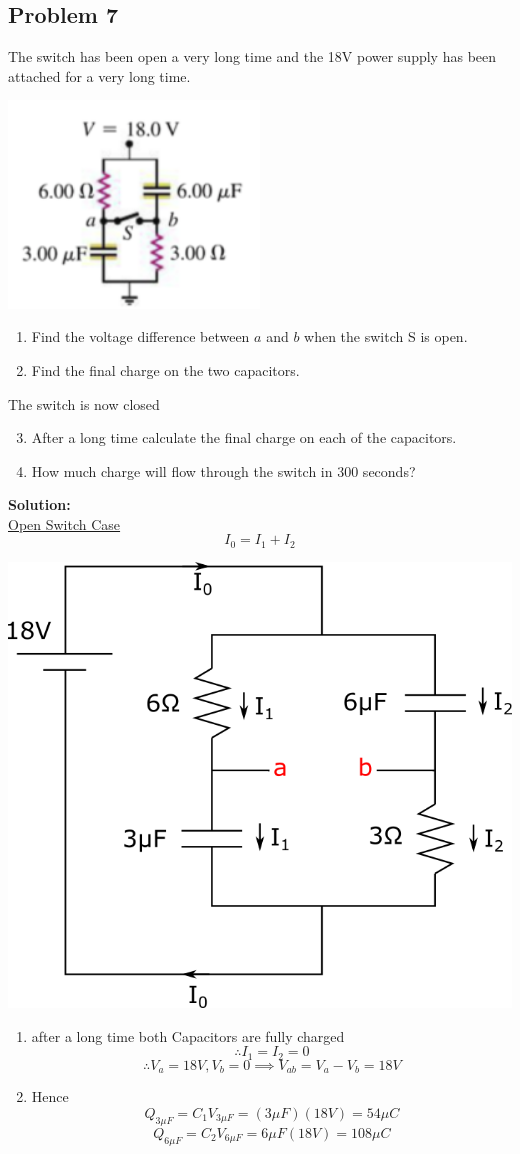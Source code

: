 \subsection*{Problem 7}
The switch has been open a very long time and the 18V power supply has been attached for a very
long time.\\
\centerline{\includegraphics[width=0.5\textwidth]{Images/P7img1.png}}
\begin{enumerate}
    \item Find the voltage difference between $a$ and $b$ when the switch S is open.
    \item Find the final charge on the two capacitors.
\end{enumerate}
The switch is now closed
\begin{enumerate}
    \setcounter{enumi}{2}
    \item After a long time calculate the final charge on each of the capacitors.
    \item How much charge will flow through the switch in 300 seconds?
\end{enumerate}

\textbf{Solution:}\\
\underline{Open Switch Case}
$$I_0 = I_1 + I_2$$
\vspace{5mm}

\hspace{5mm}\includegraphics[width=0.4\linewidth]{Images/P7img2.png}

\begin{enumerate}
    \item after a long time both Capacitors are fully charged
        $$\therefore I_1=I_2=0$$
        $$\therefore V_a=18V, V_b=0 \implies V_{ab}=V_a-V_b=18V$$
    
    \item Hence $$Q_{3\mu F}=C_1V_{3\mu F} = (3\mu F)(18V) = 54\mu C$$
        $$Q_{6\mu F} = C_2V_{6\mu F} = 6\mu F (18V) = 108\mu C$$
\end{enumerate}

